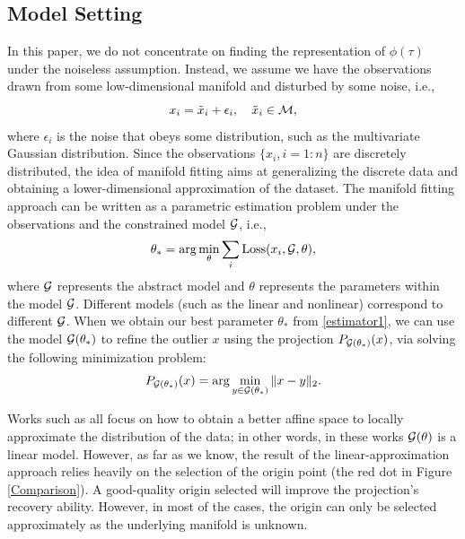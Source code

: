 \documentclass{article}
\theoremstyle{remark}
\begin{document}
\subsection{Model Setting}
In this paper, we do not  concentrate on finding the representation of $\phi(\tau)$ under the noiseless assumption. Instead, we assume we have the observations drawn from some low-dimensional manifold and disturbed by some noise, i.e., 
\[
x_i = \tilde{x}_i+\epsilon_i, \quad \tilde{x}_i \in \cal M,
\]
where $\epsilon_i$ is the noise that obeys some distribution, such as the multivariate Gaussian distribution.
Since the observations $\{x_i, i=1:n\}$ are discretely distributed, the idea of manifold fitting aims at generalizing the discrete data and obtaining a lower-dimensional approximation of the dataset. The manifold fitting approach can be written as a parametric estimation problem under the observations and the constrained model $\cal G$, i.e.,
\begin{equation}\label{estimator1}
 \theta_* =\arg \min_\theta  \sum_i {\rm Loss}(x_i, {\cal G}, \theta ),
\end{equation}
where $\cal G$ represents the abstract model and $\theta$ represents the parameters within the model $\cal G$. Different models (such as the linear and nonlinear) correspond to different $\cal G$. When we obtain our best parameter $\theta_*$ from \eqref{estimator1}, we can use the model ${\cal G}(\theta_*)$ to refine the outlier $x$ using the projection $P_{{\cal G}(\theta_*) }(x)$, via solving the following minimization problem:
\[
P_{{\cal G}(\theta_*) }(x) = \arg \min_{y\in {\cal G}(\theta_*) } \|x-y\|_2.
\]
 
Works such as \cite{genovese2014nonparametric,ozertem2011locally} all focus on how to obtain a better affine space to locally approximate the distribution of the data; in other words, in these works ${\cal G}(\theta)$ is a linear model. However, as far as we know, the result of the linear-approximation approach relies heavily on the selection of the origin point (the red dot in Figure \ref{Comparison}). A good-quality origin selected will improve the projection's recovery ability. However, in most of the cases, the origin can only be selected approximately as the underlying manifold is unknown.
\end{document}
